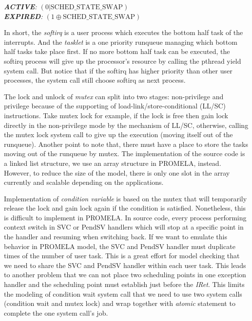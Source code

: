 {\medbreak\indent\textit{\textbf{ACTIVE}: $(0 | \text{SCHED\_STATE\_SWAP})$}}
{\\\indent\textit{\textbf{EXPIRED}: $(1 \oplus \text{SCHED\_STATE\_SWAP})$}}
\medbreak

In short, the \textit{softirq} is a user process which executes the bottom half task of the interrupts. And the \textit{tasklet} is a one priority runqueue managing which bottom half tasks take place first. If no more bottom half task can be executed, the softirq process will give up the processor's resource by calling the pthread yield system call. But notice that if the softirq has higher priority than other user processes, the system call still choose softirq as next process.

The lock and unlock of \textit{mutex} can split into two stages: non-privilege and privilege because of the supporting of load-link/store-conditional (LL/SC) instructions. Take mutex lock for example, if the lock is free then gain lock directly in the non-privilege mode by the mechanism of LL/SC, otherwise, calling the mutex lock system call to give up the execution (moving itself out of the runqueue). Another point to note that, there must have a place to store the tasks moving out of the runqueue by mutex. The implementation of the source code is a linked list structure, we use an array structure in PROMELA, instead. However, to reduce the size of the model, there is only one slot in the array currently and scalable depending on the applications.

Implementation of \textit{condition variable} is based on the mutex that will temporarily release the lock and gain lock again if the condition is satisfied. Nonetheless, this is difficult to implement in PROMELA. In source code, every process performing context switch in SVC or PendSV handlers which will stop at a specific point in the handler and resuming when switching back. If we want to emulate this behavior in PROMELA model, the SVC and PendSV handler must duplicate times of the number of user task. This is a great effort for model checking that we need to share the SVC and PendSV handler within each user task. This leads to another problem that we can not place two scheduling points in one exception handler and the scheduling point must establish just before the \textit{IRet}. This limits the modeling of condition wait system call that we need to use two system calls (condition wait and mutex lock) and wrap together with \textit{atomic} statement to complete the one system call's job.

